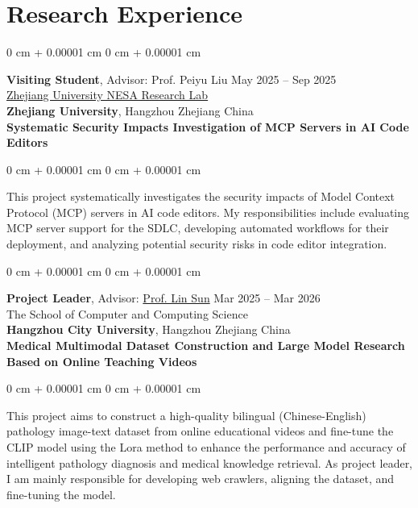 \documentclass[10pt, letterpaper]{article}
\newcommand{\entryvspace}{\vspace{0.22cm}}
\newenvironment{onecolentry}{
    \begin{adjustwidth}{
        0 cm + 0.00001 cm
    }{
        0 cm + 0.00001 cm
    }
}{
    \end{adjustwidth}
} %
\begin{document}
    \section{Research Experience}
    \begin{onecolentry}
        \textbf{Visiting Student}, Advisor: Prof. Peiyu Liu \hfill May 2025 -- Sep 2025\\
         \href{https://nesa.zju.edu.cn/}{Zhejiang University NESA Research Lab}\\\textbf{Zhejiang University}, Hangzhou Zhejiang China\\
         \vspace{0.03 cm}
        \textbf{Systematic Security Impacts Investigation of MCP Servers in AI Code Editors}
    \end{onecolentry}
    \begin{onecolentry}
        This project systematically investigates the security impacts of Model Context Protocol (MCP) servers in AI code editors. My responsibilities include evaluating MCP server support for the SDLC, developing automated workflows for their deployment, and analyzing potential security risks in code editor integration.
    \end{onecolentry}
    \entryvspace
    \begin{onecolentry}
        \textbf{Project Leader}, Advisor: \href{https://scholar.google.com/citations?hl=zh-CN&user=48cqMXkAAAAJ}{Prof. Lin Sun} \hfill Mar 2025 -- Mar 2026\\
        The School of Computer and Computing Science\\ \textbf{Hangzhou City University}, Hangzhou Zhejiang China\\
        \vspace{0.03 cm}
        \textbf{Medical Multimodal Dataset Construction and Large Model Research Based on Online Teaching Videos}
    \end{onecolentry}
    \begin{onecolentry}
        This project aims to construct a high-quality bilingual (Chinese-English) pathology image-text dataset from online educational videos and fine-tune the CLIP model using the Lora method to enhance the performance and accuracy of intelligent pathology diagnosis and medical knowledge retrieval. As project leader, I am mainly responsible for developing web crawlers, aligning the dataset, and fine-tuning the model.
    \end{onecolentry}

\end{document}
